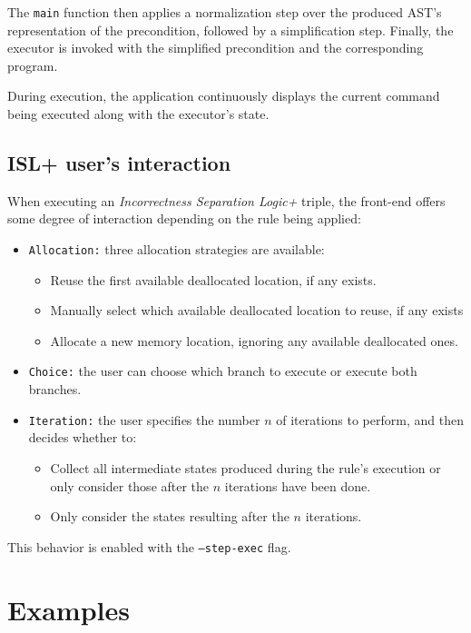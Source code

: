 \documentclass[parskip=half]{scrartcl}
\begin{document}
The \texttt{main} function then applies a normalization step over the produced AST's representation of the precondition, followed by a simplification step.
Finally, the executor is invoked with the simplified precondition and the corresponding program.

During execution, the application continuously displays the current command being executed along with the executor’s state.

\subsection{ISL+ user's interaction}
When executing an \textit{Incorrectness Separation Logic+} triple, the front-end offers some degree of interaction depending on the rule being applied:

\begin{itemize}
  \item \texttt{Allocation:} three allocation strategies are available:
    \begin{itemize}
      \item Reuse the first available deallocated location, if any exists.
      \item Manually select which available deallocated location to reuse, if any exists
      \item Allocate a new memory location, ignoring any available deallocated ones.
    \end{itemize}
  \item \texttt{Choice:} the user can choose which branch to execute or execute both branches.
  \item \texttt{Iteration:} the user specifies the number $n$ of iterations to perform, and then decides whether to: 
    \begin{itemize}
      \item Collect all intermediate states produced during the rule's execution or only consider those after the $n$ iterations have been done.
      \item Only consider the states resulting after the $n$ iterations.
    \end{itemize}
\end{itemize}

This behavior is enabled with the \texttt{--step-exec} flag.

\section{Examples}
\end{document}
